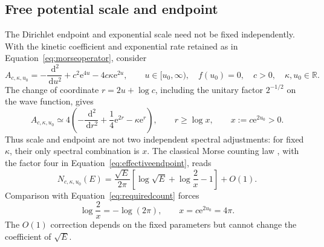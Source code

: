 \documentclass[11pt,letterpaper]{article}
\numberwithin{equation}{section}
\theoremstyle{definition}
\theoremstyle{remark}
\newcommand{\R}{\mathbb R}
\newcommand{\dd}{\,\mathrm d}
\newcommand{\e}{\mathrm e}
\begin{document}
\subsection{Free potential scale and endpoint}
\label{subsec:scaleendpoint}
The Dirichlet endpoint and exponential scale need not be fixed independently. With the kinetic coefficient and exponential rate retained as in Equation~\eqref{eq:morseoperator}, consider
\begin{equation}
 A_{c,\kappa,u_0}=-\frac{\dd^2}{\dd u^2}
       +c^2\e^{4u}-4c\kappa\e^{2u},\qquad
 u\in[u_0,\infty),\quad f(u_0)=0,
 \quad c>0,\quad \kappa,u_0\in\R.
 \label{eq:freemorse}
\end{equation}
The change of coordinate $r=2u+\log c$, including the unitary factor $2^{-1/2}$ on the wave function, gives
\begin{equation}
 A_{c,\kappa,u_0}\simeq
 4\left(-\frac{\dd^2}{\dd r^2}
             +\frac14\e^{2r}-\kappa\e^r\right),\qquad
 r\geq\log x,\qquad x:=c\e^{2u_0}>0.
 \label{eq:effectiveendpoint}
\end{equation}
Thus scale and endpoint are not two independent spectral adjustments: for fixed $\kappa$, their only spectral combination is $x$. The classical Morse counting law \cite[Theorem~3.2]{lagarias}, with the factor four in Equation~\eqref{eq:effectiveendpoint}, reads
\begin{equation}
 N_{c,\kappa,u_0}(E)
 =\frac{\sqrt E}{2\pi}
   \left[\log\sqrt E+\log\frac2x-1\right]+O(1).
 \label{eq:freeendpointcount}
\end{equation}
Comparison with Equation~\eqref{eq:requiredcount} forces
\begin{equation}
 \log\frac2x=-\log(2\pi),\qquad
 x=c\e^{2u_0}=4\pi.
 \label{eq:endpointcalibration}
\end{equation}
The $O(1)$ correction depends on the fixed parameters but cannot change the coefficient of $\sqrt E$.
\end{document}
